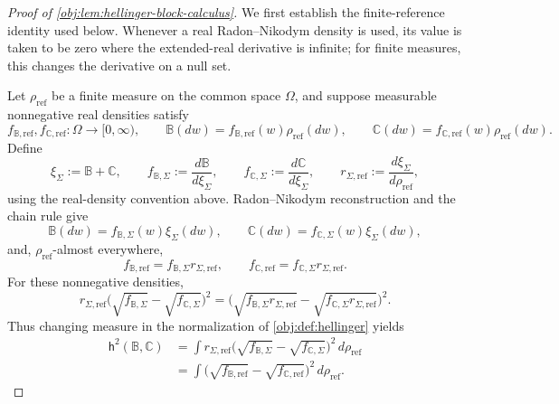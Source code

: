 \begin{proof}[Proof of \cref{obj:lem:hellinger-block-calculus}]
We first establish the finite-reference identity used below. Whenever a real Radon--Nikodym density is used, its value is taken to be zero where the extended-real derivative is infinite; for finite measures, this changes the derivative on a null set.

Let \(\rho_{\mathrm{ref}}\) be a finite measure on the common space \(\Omega\), and suppose measurable nonnegative real densities satisfy
\[
f_{\mathbb B,\mathrm{ref}},f_{\mathbb C,\mathrm{ref}}
   :\Omega\longrightarrow[0,\infty),
\qquad
\mathbb B(dw)=f_{\mathbb B,\mathrm{ref}}(w)\rho_{\mathrm{ref}}(dw),
\qquad
\mathbb C(dw)=f_{\mathbb C,\mathrm{ref}}(w)\rho_{\mathrm{ref}}(dw).
\]
Define
\[
\xi_{\Sigma}:=\mathbb B+\mathbb C,
\qquad
f_{\mathbb B,\Sigma}:=\frac{d\mathbb B}{d\xi_{\Sigma}},
\qquad
f_{\mathbb C,\Sigma}:=\frac{d\mathbb C}{d\xi_{\Sigma}},
\qquad
r_{\Sigma,\mathrm{ref}}:=\frac{d\xi_{\Sigma}}{d\rho_{\mathrm{ref}}},
\]
using the real-density convention above. Radon--Nikodym reconstruction and the chain rule give
\[
\mathbb B(dw)=f_{\mathbb B,\Sigma}(w)\xi_{\Sigma}(dw),
\qquad
\mathbb C(dw)=f_{\mathbb C,\Sigma}(w)\xi_{\Sigma}(dw),
\]
and, \(\rho_{\mathrm{ref}}\)-almost everywhere,
\[
f_{\mathbb B,\mathrm{ref}}
   =f_{\mathbb B,\Sigma}r_{\Sigma,\mathrm{ref}},
\qquad
f_{\mathbb C,\mathrm{ref}}
   =f_{\mathbb C,\Sigma}r_{\Sigma,\mathrm{ref}}.
\]
For these nonnegative densities,
\[
r_{\Sigma,\mathrm{ref}}
 \bigl(\sqrt{f_{\mathbb B,\Sigma}}
             -\sqrt{f_{\mathbb C,\Sigma}}\bigr)^2
=
\bigl(\sqrt{f_{\mathbb B,\Sigma}r_{\Sigma,\mathrm{ref}}}
             -\sqrt{f_{\mathbb C,\Sigma}r_{\Sigma,\mathrm{ref}}}\bigr)^2.
\]
Thus changing measure in the normalization of \cref{obj:def:hellinger} yields
\[
\begin{aligned}
\mathsf h^2(\mathbb B,\mathbb C)
&=\int
 r_{\Sigma,\mathrm{ref}}
 \bigl(\sqrt{f_{\mathbb B,\Sigma}}
             -\sqrt{f_{\mathbb C,\Sigma}}\bigr)^2
 \,d\rho_{\mathrm{ref}}\\
&=\int
 \bigl(\sqrt{f_{\mathbb B,\mathrm{ref}}}
             -\sqrt{f_{\mathbb C,\mathrm{ref}}}\bigr)^2
 \,d\rho_{\mathrm{ref}}.
\end{aligned}
\]


\end{proof}
